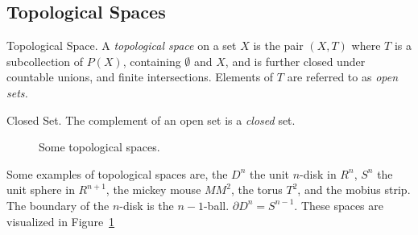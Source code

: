 \subsection{Topological Spaces}
\begin{definition}{Topological Space.}
A \emph{topological space} on a set $X$ is the pair $(X,T)$ where $T$ is a subcollection of $P(X)$, containing $\emptyset$ and $X$, and is further closed under countable unions, and finite intersections. Elements of $T$ are referred to as \emph{open sets.}
\end{definition}
\begin{definition}{Closed Set.}
 The complement of an open set is a \emph{closed} set.
\end{definition}
\begin{figure}
\centering
{}
\caption{Some topological spaces.}
\label{fig:example-ts}
\end{figure}
Some examples of topological spaces are, the $D^n$ the unit $n$-disk in $R^n$, $S^n$ the unit sphere in $R^{n+1}$, the mickey mouse $MM^2$, the torus $T^2$, and the mobius strip. The boundary of the $n$-disk is the $n-1$-ball. $\partial D^n = S^{n-1}$. These spaces are visualized in Figure~\ref{fig:example-ts}

